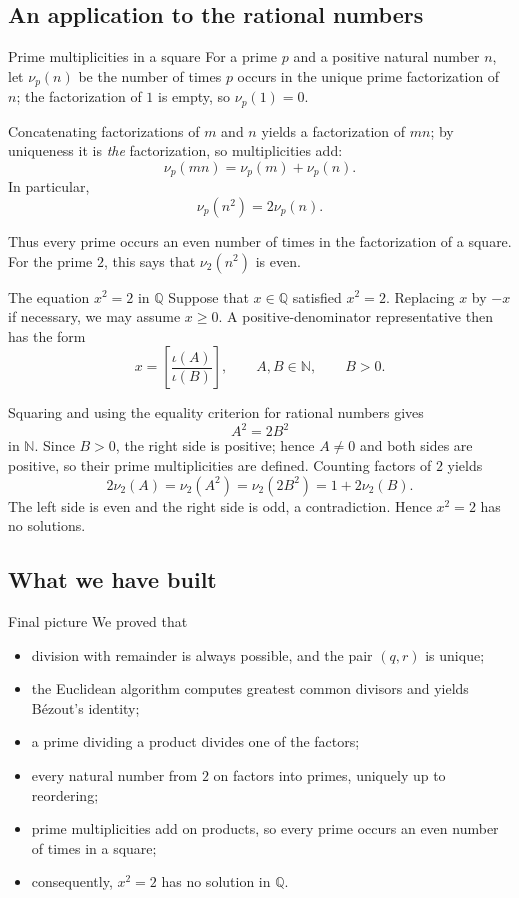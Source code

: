 \documentclass[aspectratio=169,11pt]{beamer}
\newcommand{\N}{\mathbb N}
\newcommand{\Q}{\mathbb Q}
\newcommand{\qcl}[2]{\left[\frac{#1}{#2}\right]}
\begin{document}
\subsection{An application to the rational numbers}

\begin{frame}{Prime multiplicities in a square}
  For a prime \(p\) and a positive natural number \(n\), let
  \(\nu_p(n)\) be the number of times \(p\) occurs in the unique prime
  factorization of \(n\); the factorization of \(1\) is empty, so
  \(\nu_p(1)=0\).

  Concatenating factorizations of \(m\) and \(n\) yields a factorization of
  \(mn\); by uniqueness it is \emph{the} factorization, so multiplicities
  add:
  \[
    \nu_p(mn)=\nu_p(m)+\nu_p(n).
  \]
  In particular,
  \[
    \boxed{\nu_p(n^2)=2\nu_p(n).}
  \]

  Thus every prime occurs an even number of times in the factorization of a
  square.  For the prime \(2\), this says that \(\nu_2(n^2)\) is even.
\end{frame}

\begin{frame}{The equation \(x^2=2\) in \(\Q\)}
  Suppose that \(x\in\Q\) satisfied \(x^2=2\).  Replacing \(x\) by \(-x\)
  if necessary, we may assume \(x\ge0\).  A positive-denominator
  representative then has the form
  \[
    x=\qcl{\iota(A)}{\iota(B)},
    \qquad
    A,B\in\N,\qquad B>0.
  \]

  Squaring and using the equality criterion for rational numbers gives
  \[
    A^2=2B^2
  \]
  in \(\N\).  Since \(B>0\), the right side is positive; hence \(A\ne0\)
  and both sides are positive, so their prime multiplicities are defined.  Counting factors of \(2\) yields
  \[
    2\nu_2(A)=\nu_2(A^2)
      =\nu_2(2B^2)=1+2\nu_2(B).
  \]
  The left side is even and the right side is odd, a contradiction.  Hence
  \(x^2=2\) has no solutions.
\end{frame}

\subsection{What we have built}

\begin{frame}{Final picture}
  We proved that
  \begin{itemize}
    \item division with remainder is always possible, and the pair
      \((q,r)\) is unique;
    \item the Euclidean algorithm computes greatest common divisors and
      yields Bézout's identity;
    \item a prime dividing a product divides one of the factors;
    \item every natural number from \(2\) on factors into primes, uniquely
      up to reordering;
    \item prime multiplicities add on products, so every prime occurs an
      even number of times in a square;
    \item consequently, \(x^2=2\) has no solution in \(\Q\).
  \end{itemize}
\end{frame}
\end{document}
